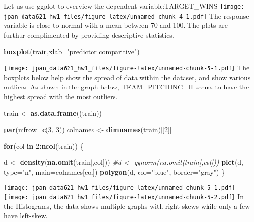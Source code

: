 \documentclass[]{article}
\newenvironment{Shaded}{\begin{snugshade}}{\end{snugshade}}
\newcommand{\KeywordTok}[1]{\textcolor[rgb]{0.13,0.29,0.53}{\textbf{#1}}}
\newcommand{\DataTypeTok}[1]{\textcolor[rgb]{0.13,0.29,0.53}{#1}}
\newcommand{\DecValTok}[1]{\textcolor[rgb]{0.00,0.00,0.81}{#1}}
\newcommand{\StringTok}[1]{\textcolor[rgb]{0.31,0.60,0.02}{#1}}
\newcommand{\CommentTok}[1]{\textcolor[rgb]{0.56,0.35,0.01}{\textit{#1}}}
\newcommand{\ControlFlowTok}[1]{\textcolor[rgb]{0.13,0.29,0.53}{\textbf{#1}}}
\newcommand{\OperatorTok}[1]{\textcolor[rgb]{0.81,0.36,0.00}{\textbf{#1}}}
\newcommand{\NormalTok}[1]{#1}
\begin{document}
Let us use ggplot to overview the dependent variable:TARGET\_WINS
\texttt{[image: jpan\_data621\_hw1\_files/figure-latex/unnamed-chunk-4-1.pdf]}
The response variable is close to normal with a mean between 70 and 100.
The plots are furthur complimented by providing descriptive statistics.

\begin{Shaded}
\begin{Highlighting}[]
\KeywordTok{boxplot}\NormalTok{(train,}\DataTypeTok{xlab=}\StringTok{"predictor comparitive"}\NormalTok{)}
\end{Highlighting}
\end{Shaded}

\texttt{[image: jpan\_data621\_hw1\_files/figure-latex/unnamed-chunk-5-1.pdf]}
The boxplots below help show the spread of data within the dataset, and
show various outliers. As shown in the graph below, TEAM\_PITCHING\_H
seems to have the highest spread with the most outliers.

\begin{Shaded}
\begin{Highlighting}[]
\NormalTok{train <-}\StringTok{ }\KeywordTok{as.data.frame}\NormalTok{((train))}

\KeywordTok{par}\NormalTok{(}\DataTypeTok{mfrow=}\KeywordTok{c}\NormalTok{(}\DecValTok{3}\NormalTok{, }\DecValTok{3}\NormalTok{))}
\NormalTok{colnames <-}\StringTok{ }\KeywordTok{dimnames}\NormalTok{(train)[[}\DecValTok{2}\NormalTok{]]}

  \ControlFlowTok{for}\NormalTok{(col }\ControlFlowTok{in} \DecValTok{2}\OperatorTok{:}\KeywordTok{ncol}\NormalTok{(train)) \{}

\NormalTok{    d <-}\StringTok{ }\KeywordTok{density}\NormalTok{(}\KeywordTok{na.omit}\NormalTok{(train[,col]))}
   \CommentTok{#d <- qqnorm(na.omit(train[,col]))}
    \KeywordTok{plot}\NormalTok{(d, }\DataTypeTok{type=}\StringTok{"n"}\NormalTok{, }\DataTypeTok{main=}\NormalTok{colnames[col])}
    \KeywordTok{polygon}\NormalTok{(d, }\DataTypeTok{col=}\StringTok{"blue"}\NormalTok{, }\DataTypeTok{border=}\StringTok{"gray"}\NormalTok{)}
\NormalTok{  \}}
\end{Highlighting}
\end{Shaded}

\texttt{[image: jpan\_data621\_hw1\_files/figure-latex/unnamed-chunk-6-1.pdf]}
\texttt{[image: jpan\_data621\_hw1\_files/figure-latex/unnamed-chunk-6-2.pdf]}
In the Histograms, the data shows multiple graphs with right skews while
only a few have left-skew.
\end{document}
